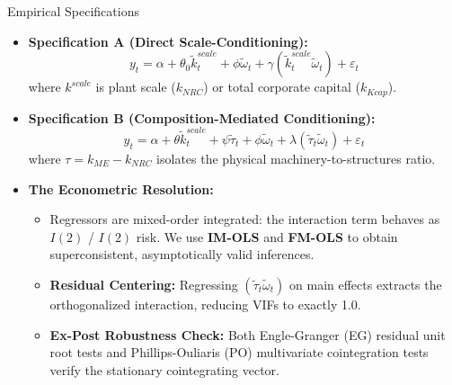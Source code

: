\documentclass[10pt]{beamer}
\begin{document}
\begin{frame}{Empirical Specifications}
  \begin{itemize}
    \item \textbf{Specification A (Direct Scale-Conditioning):}
      $$y_t = \alpha + \theta_0 \tilde{k}^{scale}_t + \phi \tilde{\omega}_t + \gamma (\tilde{k}^{scale}_t \tilde{\omega}_t) + \varepsilon_t$$
      where $k^{scale}$ is plant scale ($k_{NRC}$) or total corporate capital ($k_{Kcap}$).
    \item \textbf{Specification B (Composition-Mediated Conditioning):}
      $$y_t = \alpha + \theta \tilde{k}^{scale}_t + \psi \tilde{\tau}_t + \phi \tilde{\omega}_t + \lambda (\tilde{\tau}_t \tilde{\omega}_t) + \varepsilon_t$$
      where $\tau = k_{ME} - k_{NRC}$ isolates the physical machinery-to-structures ratio.
    \item \textbf{The Econometric Resolution:}
      \begin{itemize}
        \item Regressors are mixed-order integrated: the interaction term behaves as $I(2)$ / $I(2)$ risk. We use \textbf{IM-OLS} and \textbf{FM-OLS} to obtain superconsistent, asymptotically valid inferences.
        \item \textbf{Residual Centering:} Regressing $(\tilde{\tau}_t \tilde{\omega}_t)$ on main effects extracts the orthogonalized interaction, reducing VIFs to exactly 1.0.
        \item \textbf{Ex-Post Robustness Check:} Both Engle-Granger (EG) residual unit root tests and Phillips-Ouliaris (PO) multivariate cointegration tests verify the stationary cointegrating vector.
      \end{itemize}
  \end{itemize}
\end{frame}
\end{document}
